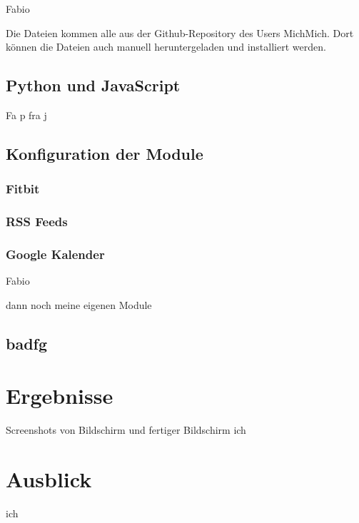 \documentclass[12pt,a4paper]{report}
\begin{document}
Fabio


Die Dateien kommen alle aus der Github-Repository des Users MichMich. Dort können die Dateien auch manuell heruntergeladen und installiert werden. 
\section{Python und JavaScript}
Fa p fra j
\section{Konfiguration der Module}
\subsection{Fitbit}
\subsection{RSS Feeds}
\subsection{Google Kalender}
Fabio

dann noch meine eigenen Module
\section{badfg}






\chapter{Ergebnisse}
Screenshots von Bildschirm und fertiger Bildschirm
ich
\chapter{Ausblick}
ich
\end{document}
